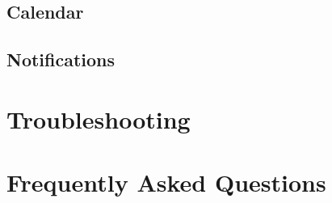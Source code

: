 \documentclass[12pt]{article}
\begin{document}
\subsection{Calendar}

\subsection{Notifications}



\section{Troubleshooting}

\section{Frequently Asked Questions}

\end{document}
